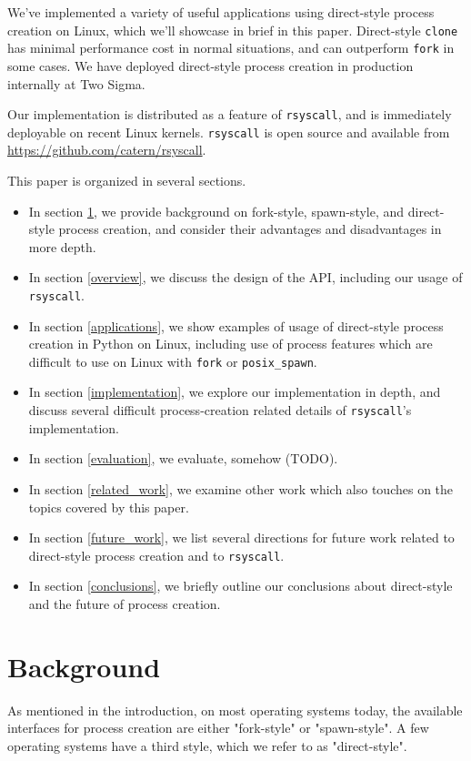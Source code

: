 \documentclass[sigplan]{acmart}
\begin{document}
We've implemented a variety of useful applications using direct-style process creation on Linux,
which we'll showcase in brief in this paper.
Direct-style \texttt{clone} has minimal performance cost in normal situations,
and can outperform \texttt{fork} in some cases.
We have deployed direct-style process creation in production internally at Two Sigma.

Our implementation is distributed as a feature of \texttt{rsyscall},
and is immediately deployable on recent Linux kernels.
\texttt{rsyscall} is open source and available from \url{https://github.com/catern/rsyscall}.

This paper is organized in several sections.
\begin{itemize}
\item In section \ref{background}, we provide background on fork-style, spawn-style, and direct-style process creation,
and consider their advantages and disadvantages in more depth.
\item In section \ref{overview}, we discuss the design of the API,
including our usage of \texttt{rsyscall}.
\item In section \ref{applications}, we show examples of usage of direct-style process creation in Python on Linux,
including use of process features which are difficult to use on Linux with \texttt{fork} or \texttt{posix\_spawn}.
\item In section \ref{implementation}, we explore our implementation in depth,
and discuss several difficult process-creation related details of \texttt{rsyscall}'s implementation.
\item In section \ref{evaluation}, we evaluate, somehow (TODO).
\item In section \ref{related_work},
we examine other work which also touches on the topics covered by this paper.
\item In section \ref{future_work},
we list several directions for future work related to direct-style process creation and to \texttt{rsyscall}.
\item In section \ref{conclusions}, we briefly outline our conclusions about direct-style and the future of process creation.
\end{itemize}
\section{Background}\label{background}
As mentioned in the introduction,
on most operating systems today,
the available interfaces for process creation
are either "fork-style" or "spawn-style".
A few operating systems have a third style, which we refer to as "direct-style".
\end{document}
